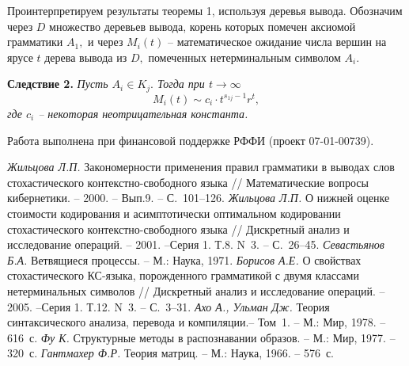 \documentclass[10pt]{article}
\begin{document}
\medskip

Проинтерпретируем результаты теоремы 1, используя деревья вывода. Обозначим через $D$ множество деревьев вывода, корень которых помечен аксиомой грамматики $A_1,$ и через $M_i(t)$ -- математическое ожидание числа вершин на ярусе $t$ дерева вывода из $D,$ помеченных нетерминальным символом $A_i.$

\medskip

{\bf Следствие 2.}
{\it 
Пусть $A_i \in K_j.$ Тогда при $t \rightarrow \infty$ 
$$
M_i(t) \sim c_i \cdot t^{s_{1j}-1} r^t  ,
$$
где $c_i$ -- некоторая неотрицательная константа.
}

\vspace{\baselineskip} Работа выполнена при финансовой поддержке РФФИ (проект 07-01-00739).

\vspace{\baselineskip}
\renewcommand{\abstractname}{Summary}
\begin{abstract}
{\it L.P.~Zhiltsova.} On a matrix of first moments for decomposable stochastic CF-grammar.

\vspace{3pt}
A stochastic context-free grammar is considered which contains arbitrary class number of nonterminal simbols without restrictions on the successor order of classes. Corresponding matrix $A$ of first moments is decomposable. For case, when perron's root of the matrix $A$ is strictly less one, properties of the matrix $A^t$ are investigated under $t \rightarrow \infty.$ 
   
\end{abstract}

\begin{thebibliography}{9}

{\it Жильцова Л.П.\/} Закономерности применения правил грамматики в выводах слов стохастического контекстно-свободного языка // Математические вопросы кибернетики. -- 2000. -- Вып.9. -- С.~101--126.
{\it Жильцова Л.П. \/} О нижней оценке стоимости кодирования и асимптотически оптимальном кодировании стохастического контекстно-свободного языка // Дискретный анализ и исследование операций. -- 2001. --Серия 1. Т.8. N~3. -- С.~26--45. 
{\it Севастьянов Б.А.\/} Ветвящиеся процессы. -- М.: Наука, 1971.
{\it Борисов А.Е. \/} О свойствах стохастического КС-языка, порожденного грамматикой с двумя классами нетерминальных символов // Дискретный анализ и исследование операций. -- 2005. --Серия 1. Т.12. N~3. -- С.~3--31. 
{\it Ахо А., Ульман Дж.\/} Теория синтаксического анализа, перевода и компиляции.-- Том~1. -- М.: Мир, 1978. -- 616~с. 
{\it Фу К.\/} Структурные методы в распознавании образов. -- М.: Мир, 1977. -- 320~с.
{\it Гантмахер Ф.Р.} Теория матриц. -- М.: Наука, 1966. -- 576~с.

\end{thebibliography}
\end{document}
